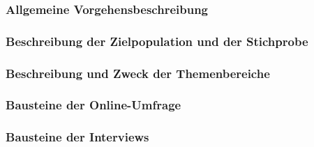 \documentclass[../../main.tex]{subfiles}
\begin{document}
\subsubsection{Allgemeine Vorgehensbeschreibung}





\subsubsection{Beschreibung der Zielpopulation und der Stichprobe}





\subsubsection{Beschreibung und Zweck der Themenbereiche}
\label{beschreibung_themenbereiche}




\subsubsection{Bausteine der Online-Umfrage}





\subsubsection{Bausteine der Interviews}


\end{document}
